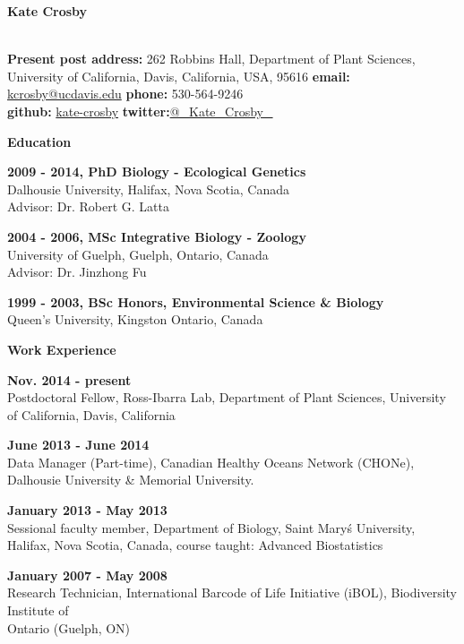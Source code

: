\documentclass[a4paper,12pt,final]{memoir}
\newcommand{\Sep}{\vspace{1.5em}}
\newcommand{\SmallSep}{\vspace{0.5em}}
\newenvironment{Contact Information}
	{\ignorespaces\textbf{\color{MidnightBlue} Contact Information}}
	{\Sep\ignorespacesafterend}
\newcommand{\CVSection}[1]
	{\Large\textbf{#1}\par
	\SmallSep\normalsize\normalfont}
\newcommand{\CVItem}[1]
	{\textbf{\color{MidnightBlue} #1}}
\begin{document}
\Huge\bfseries {\color{MidnightBlue} Kate Crosby} \\

\normalsize\normalfont

\begin{Contact Information}\\
\textbf{Present post address: } 262 Robbins Hall, Department of Plant Sciences, University of California, Davis, California, USA, 95616 \textbf{email: }\href{kcrosby@ucdavis.edu}{kcrosby@ucdavis.edu}  \textbf{phone:} 530-564-9246\\ \textbf{github:} \href{https://github.com/kate-crosby}{kate-crosby}  \textbf{twitter:}\href{https://twitter.com/\_Kate_Crosby\_}{@\_Kate\_Crosby\_}  
\end{Contact Information}

\CVSection{Education}
\CVItem{2009 - 2014, PhD Biology - Ecological Genetics}\\
Dalhousie University, Halifax, Nova Scotia, Canada\\
Advisor: Dr. Robert G. Latta
\SmallSep

\CVItem{2004 - 2006, MSc Integrative Biology - Zoology}\\
University of Guelph, Guelph, Ontario, Canada\\
Advisor: Dr. Jinzhong Fu
\SmallSep

\CVItem{1999 - 2003, BSc Honors, Environmental Science \& Biology}\\
Queen's University, Kingston Ontario, Canada
\SmallSep

\Sep

\CVSection{Work Experience}
\CVItem{Nov. 2014 - present}\\
Postdoctoral Fellow, Ross-Ibarra Lab, Department of Plant Sciences, University of California, Davis, California
\SmallSep

\CVItem{June 2013 - June 2014}\\
Data Manager (Part-time), Canadian Healthy Oceans Network (CHONe), Dalhousie University \& Memorial University.
\SmallSep

\CVItem{January 2013 - May 2013}\\
Sessional faculty member, Department of Biology, Saint Mary\'s University, Halifax, Nova Scotia, Canada, course taught: Advanced Biostatistics
\SmallSep

\CVItem{January 2007 - May 2008}\\
Research Technician, International Barcode of Life Initiative (iBOL), Biodiversity Institute of\\ Ontario (Guelph, ON)
\end{document}

